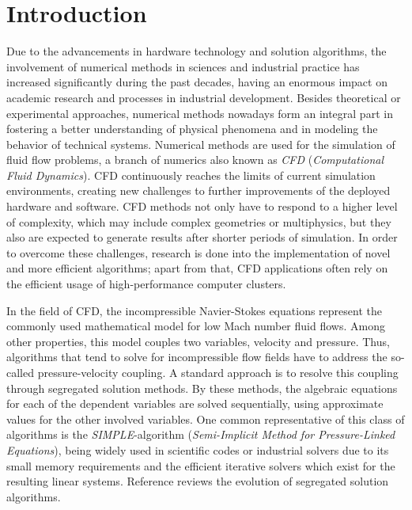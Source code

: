 \chapter{Introduction}

Due to the advancements in hardware technology and solution algorithms, the involvement of numerical methods in sciences and industrial practice has increased significantly during the past decades, having an enormous impact on academic research and processes in industrial development. Besides theoretical or experimental approaches, numerical methods nowadays form an integral part in fostering a better understanding of physical phenomena and in modeling the behavior of technical systems. Numerical methods are used for the simulation of fluid flow problems, a branch of numerics also known as \emph{CFD} (\emph{Computational Fluid Dynamics}). CFD continuously reaches the limits of current simulation environments, creating new challenges to further improvements of the deployed hardware and software. CFD methods not only have to respond to a higher level of complexity, which may include complex geometries or multiphysics, but they also are expected to generate results after shorter periods of simulation. In order to overcome these challenges, research is done into the implementation of novel and more efficient algorithms; apart from that, CFD applications often rely on the efficient usage of high-performance computer clusters. 

In the field of CFD, the incompressible Navier-Stokes equations represent the commonly used mathematical model for low Mach number fluid flows. Among other properties, this model couples two variables, velocity and pressure. Thus, algorithms that tend to solve for incompressible flow fields have to address the so-called pressure-velocity coupling. A standard approach is to resolve this coupling through segregated solution methods. By these methods, the algebraic equations for each of the dependent variables are solved sequentially, using approximate values for the other involved variables. One common representative of this class of algorithms is the \emph{SIMPLE}-algorithm (\emph{Semi-Implicit Method for Pressure-Linked Equations}), being widely used in scientific codes or industrial solvers due to its small memory requirements and the efficient iterative solvers which exist for the resulting linear systems. Reference \cite{acharya07} reviews the evolution of segregated solution algorithms.

